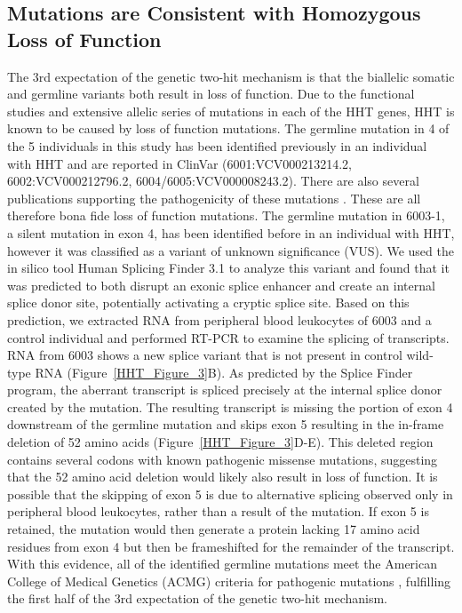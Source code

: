 \subsection{Mutations are Consistent with Homozygous Loss of Function}
The 3rd expectation of the genetic two-hit mechanism is that the biallelic somatic and germline variants both result in loss of function. Due to the functional studies and extensive allelic series of mutations in each of the HHT genes, HHT is known to be caused by loss of function mutations.   The germline mutation in 4 of the 5 individuals in this study has been identified previously in an individual with HHT and are reported in ClinVar (6001:VCV000213214.2, 6002:VCV000212796.2, 6004/6005:VCV000008243.2).   There are also several publications supporting the pathogenicity of these mutations \citep{johnson1995, bossler2006, gallione1998, ricard2010, olivieri2007}.  These are all therefore bona fide loss of function mutations.  The germline mutation in 6003-1, a silent mutation in  exon 4, has been identified before in an individual with HHT, however it was classified as a variant of unknown significance (VUS). We used the in silico tool Human Splicing Finder 3.1 \citep{desmet2009} to analyze this variant and found that it was predicted to both disrupt an exonic splice enhancer and create an internal splice donor site, potentially activating a cryptic splice site. Based on this prediction, we extracted RNA from peripheral blood leukocytes of 6003 and a control individual and performed RT-PCR to examine the splicing of  transcripts. RNA from 6003 shows a new splice variant that is not present in control wild-type RNA (Figure~\ref{HHT_Figure_3}B). As predicted by the Splice Finder program, the aberrant transcript is spliced precisely at the internal splice donor created by the mutation. The resulting transcript is missing the portion of exon 4 downstream of the germline mutation and skips exon 5 resulting in the in-frame deletion of 52 amino acids (Figure~\ref{HHT_Figure_3}D-E). This deleted region contains several codons with known pathogenic missense mutations, suggesting that the 52 amino acid deletion would likely also result in loss of function. It is possible that the skipping of exon 5 is due to alternative splicing observed only in peripheral blood leukocytes, rather than a result of the mutation. If exon 5 is retained, the mutation would then generate a protein lacking 17 amino acid residues from exon 4 but then be frameshifted for the remainder of the transcript.  With this evidence, all of the identified germline mutations meet the American College of Medical Genetics (ACMG) criteria for pathogenic mutations \citep{richards2015}, fulfilling the first half of the 3rd expectation of the genetic two-hit mechanism.  

